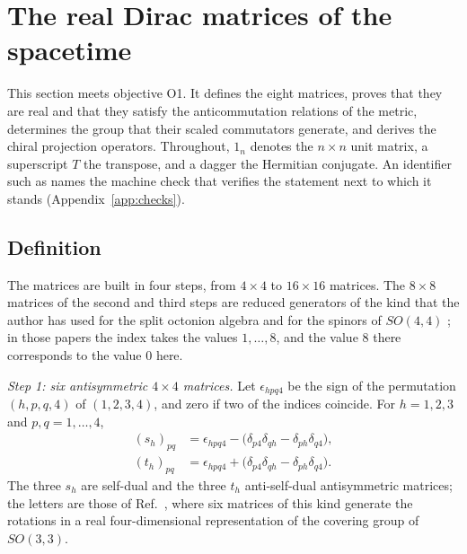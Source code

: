 
\section{The real Dirac matrices of the  spacetime}
\label{sec:matrices}

This section meets objective O1. It defines the eight matrices, proves that they are real and that
they satisfy the anticommutation relations of the metric, determines the group that their scaled
commutators generate, and derives the chiral projection operators. Throughout, $1_n$ denotes the
$n\times n$ unit matrix, a superscript $T$ the transpose, and a dagger the Hermitian conjugate. An
identifier such as  names the machine check that verifies the
statement next to which it stands (Appendix~\ref{app:checks}).

\subsection{Definition}
\label{sec:def}

The matrices are built in four steps, from $4\times4$ to $16\times16$ matrices. The $8\times8$ matrices
of the second and third steps are reduced generators of the kind that the author has used for the split
octonion algebra and for the spinors of $SO(4,4)$ \cite{Nash1990,Nash2010}; in those papers the index
takes the values $1,\dots,8$, and the value 8 there corresponds to the value 0 here.

\emph{Step 1: six antisymmetric $4\times4$ matrices.} Let $\epsilon_{hpq4}$ be the sign of the
permutation $(h,p,q,4)$ of $(1,2,3,4)$, and zero if two of the indices coincide. For $h=1,2,3$ and
$p,q=1,\dots,4$,
\begin{align}
(s_h)_{pq}&=\epsilon_{hpq4}-\big(\delta_{p4}\delta_{qh}-\delta_{ph}\delta_{q4}\big),\nonumber\\
(t_h)_{pq}&=\epsilon_{hpq4}+\big(\delta_{p4}\delta_{qh}-\delta_{ph}\delta_{q4}\big).
\label{eq:st}
\end{align}
The three $s_h$ are self-dual and the three $t_h$ anti-self-dual antisymmetric matrices; the letters
are those of Ref.~\cite{Nash1984}, where six matrices of this kind generate the rotations in a real
four-dimensional representation of the covering group of $SO(3,3)$.

